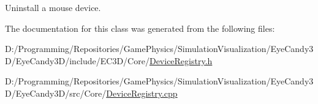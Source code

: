Uninstall a mouse device. 



The documentation for this class was generated from the following files\+:\begin{DoxyCompactItemize}
\item 
D\+:/\+Programming/\+Repositories/\+Game\+Physics/\+Simulation\+Visualization/\+Eye\+Candy3\+D/\+Eye\+Candy3\+D/include/\+E\+C3\+D/\+Core/\mbox{\hyperlink{_device_registry_8h}{Device\+Registry.\+h}}\item 
D\+:/\+Programming/\+Repositories/\+Game\+Physics/\+Simulation\+Visualization/\+Eye\+Candy3\+D/\+Eye\+Candy3\+D/src/\+Core/\mbox{\hyperlink{_device_registry_8cpp}{Device\+Registry.\+cpp}}\end{DoxyCompactItemize}
